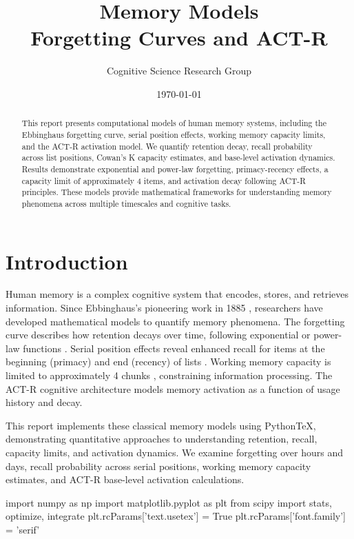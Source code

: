 \documentclass[11pt,a4paper]{article}
\title{Memory Models\\Forgetting Curves and ACT-R}
\author{Cognitive Science Research Group}
\date{\today}
\begin{document}
\maketitle

\begin{abstract}
This report presents computational models of human memory systems, including the Ebbinghaus forgetting curve, serial position effects, working memory capacity limits, and the ACT-R activation model. We quantify retention decay, recall probability across list positions, Cowan's K capacity estimates, and base-level activation dynamics. Results demonstrate exponential and power-law forgetting, primacy-recency effects, a capacity limit of approximately 4 items, and activation decay following ACT-R principles. These models provide mathematical frameworks for understanding memory phenomena across multiple timescales and cognitive tasks.
\end{abstract}

\section{Introduction}

Human memory is a complex cognitive system that encodes, stores, and retrieves information. Since Ebbinghaus's pioneering work in 1885 \cite{ebbinghaus1885}, researchers have developed mathematical models to quantify memory phenomena. The forgetting curve describes how retention decays over time, following exponential or power-law functions \cite{wixted2004}. Serial position effects reveal enhanced recall for items at the beginning (primacy) and end (recency) of lists \cite{murdock1962}. Working memory capacity is limited to approximately 4 chunks \cite{cowan2001}, constraining information processing. The ACT-R cognitive architecture \cite{anderson2004} models memory activation as a function of usage history and decay.

This report implements these classical memory models using PythonTeX, demonstrating quantitative approaches to understanding retention, recall, capacity limits, and activation dynamics. We examine forgetting over hours and days, recall probability across serial positions, working memory capacity estimates, and ACT-R base-level activation calculations.

\begin{pycode}

import numpy as np
import matplotlib.pyplot as plt
from scipy import stats, optimize, integrate
plt.rcParams['text.usetex'] = True
plt.rcParams['font.family'] = 'serif'

\end{pycode}
\end{document}
